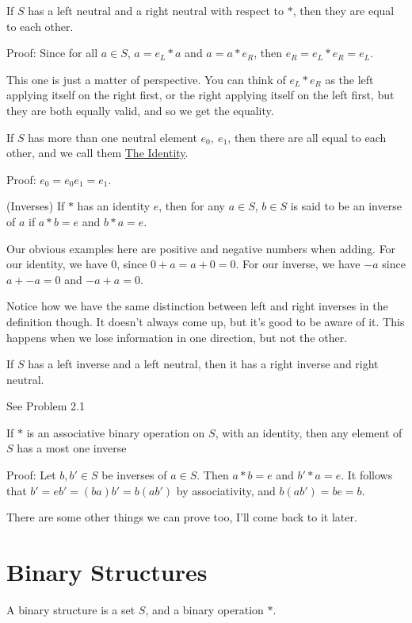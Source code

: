  If \(S\) has a left neutral and a right neutral with respect to \(*\), then they are equal to each other.

Proof: Since for all \(a \in S\), \(a = e_L*a\) and \(a = a*e_R\), then \(e_R = e_L*e_R = e_L\).

This one is just a matter of perspective. You can think of \(e_L*e_R\) as the left applying itself on the right first, or the right applying itself on the left first, but they are both equally valid, and so we get the equality.

 If \(S\) has more than one neutral element \(e_0,\ e_1\), then there are all equal to each other, and we call them \underline{The Identity}.

Proof: \(e_0 = e_0e_1 = e_1\).

 (Inverses) If \(*\) has an identity \(e\), then for any \(a \in S\), \(b \in S\) is said to be an inverse of \(a\) if \(a * b = e\) and \(b * a = e\).

Our obvious examples here are positive and negative numbers when adding. For our identity, we have \(0\), since \(0 + a = a + 0 = 0\). For our inverse, we have \(-a\) since \(a + -a = 0\) and \(-a + a = 0\).

Notice how we have the same distinction between left and right inverses in the definition though. It doesn't always come up, but it's good to be aware of it.
This happens when we lose information in one direction, but not the other.

 If \(S\) has a left inverse and a left neutral, then it has a right inverse and right neutral.

See Problem 2.1

 If \(*\) is an associative binary operation on \(S\), with an identity, then any element of \(S\) has a most one inverse

Proof: Let \(b, b' \in S\) be inverses of \(a \in S\). Then \(a*b = e\) and \(b'*a = e\). It follows that \(b' = eb' = (ba)b' = b(ab')\) by associativity, and \(b(ab') = be = b\).

There are some other things we can prove too, I'll come back to it later.

\section{Binary Structures}

 A binary structure is a set \(S\), and a binary operation \(*\).

